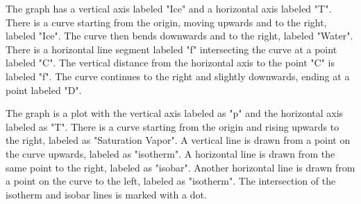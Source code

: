 The graph has a vertical axis labeled "Ice" and a horizontal axis labeled "T". There is a curve starting from the origin, moving upwards and to the right, labeled "Ice". The curve then bends downwards and to the right, labeled "Water". There is a horizontal line segment labeled "f" intersecting the curve at a point labeled "C". The vertical distance from the horizontal axis to the point "C" is labeled "f". The curve continues to the right and slightly downwards, ending at a point labeled "D".

The graph is a plot with the vertical axis labeled as "p" and the horizontal axis labeled as "T". There is a curve starting from the origin and rising upwards to the right, labeled as "Saturation Vapor". A vertical line is drawn from a point on the curve upwards, labeled as "isotherm". A horizontal line is drawn from the same point to the right, labeled as "isobar". Another horizontal line is drawn from a point on the curve to the left, labeled as "isotherm". The intersection of the isotherm and isobar lines is marked with a dot.